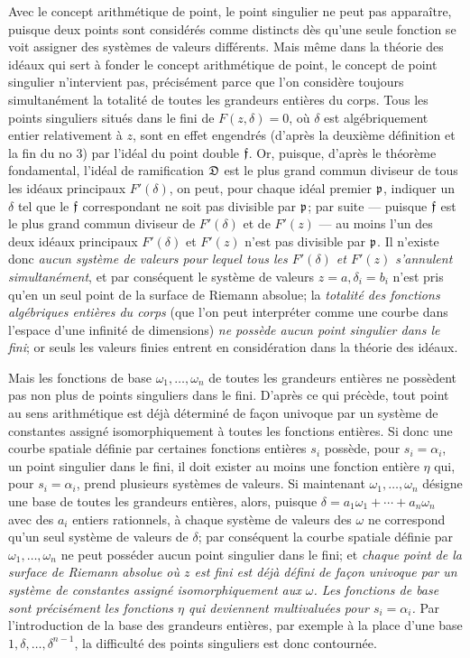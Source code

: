Avec le concept arithmétique de point, le point singulier ne peut pas apparaître, puisque deux points sont considérés comme distincts dès qu'une seule fonction se voit assigner des systèmes de valeurs différents. Mais même dans la théorie des idéaux qui sert à fonder le concept arithmétique de point, le concept de point singulier n'intervient pas, précisément parce que l'on considère toujours simultanément la totalité de toutes les grandeurs entières du corps. Tous les points singuliers situés dans le fini de \(F(z,\delta)=0\), où \(\delta\) est algébriquement entier relativement à \(z\), sont en effet engendrés (d'après la deuxième définition et la fin du no 3) par l'\og{}idéal du point double\fg{} \(\mathfrak f\). Or, puisque, d'après le théorème fondamental, l'idéal de ramification \(\mathfrak D\) est le plus grand commun diviseur de tous les idéaux principaux \(F'(\delta)\), on peut, pour chaque idéal premier \(\mathfrak p\), indiquer un \(\delta\) tel que le \(\mathfrak f\) correspondant ne soit pas divisible par \(\mathfrak p\); par suite --- puisque \(\mathfrak f\) est le plus grand commun diviseur de \(F'(\delta)\) et de \(F'(z)\) --- au moins l'un des deux idéaux principaux \(F'(\delta)\) et \(F'(z)\) n'est pas divisible par \(\mathfrak p\). Il n'existe donc \emph{aucun système de valeurs pour lequel tous les \(F'(\delta)\) et \(F'(z)\) s'annulent simultanément}, et par conséquent le système de valeurs \(z=a,\delta_i=b_i\) n'est pris qu'en un seul point de la surface de Riemann absolue; la \emph{totalité des fonctions algébriques entières du corps} (que l'on peut interpréter comme une courbe dans l'espace d'une infinité de dimensions) \emph{ne possède aucun point singulier dans le fini}; or seuls les valeurs finies entrent en considération dans la théorie des idéaux.

Mais les fonctions de base \(\omega_1,\ldots,\omega_n\) de toutes les grandeurs entières ne possèdent pas non plus de points singuliers dans le fini. D'après ce qui précède, tout point au sens arithmétique est déjà déterminé de façon univoque par un système de constantes assigné isomorphiquement à toutes les fonctions entières. Si donc une \og{}courbe spatiale\fg{} définie par certaines fonctions entières \(s_i\) possède, pour \(s_i=\alpha_i\), un point singulier dans le fini, il doit exister au moins une fonction entière \(\eta\) qui, pour \(s_i=\alpha_i\), prend plusieurs systèmes de valeurs. Si maintenant \(\omega_1,
\ldots,\omega_n\) désigne une base de toutes les grandeurs entières, alors, puisque \(\delta=a_1\omega_1+\cdots+a_n\omega_n\) avec des \(a_i\) entiers rationnels, à chaque système de valeurs des \(\omega\) ne correspond qu'un seul système de valeurs de \(\delta\); par conséquent la courbe spatiale définie par \(\omega_1,
\ldots,\omega_n\) ne peut posséder aucun point singulier dans le fini; et \emph{chaque point de la surface de Riemann absolue où \(z\) est fini est déjà défini de façon univoque par un système de constantes assigné isomorphiquement aux \(\omega\). Les fonctions de base sont précisément les fonctions \(\eta\) qui deviennent multivaluées pour \(s_i=\alpha_i\).} Par l'introduction de la base des grandeurs entières, par exemple à la place d'une base \(1,\delta,\ldots,\delta^{n-1}\), la difficulté des points singuliers est donc contournée.

